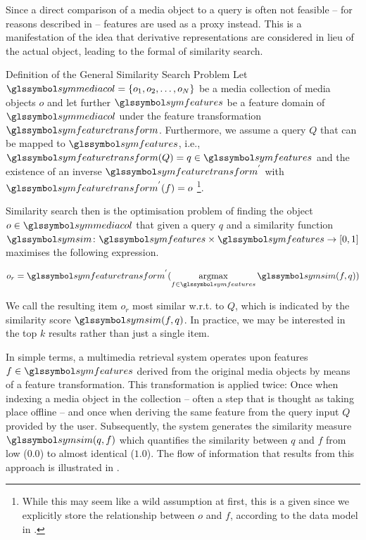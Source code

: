 Since a direct comparison of a media object to a query is often not feasible -- for reasons described in  -- features are used as a proxy instead. This is a manifestation of the idea that derivative representations are considered in lieu of the actual object, leading to the formal  of similarity search.

\begin{definition}[label=definition:similarity_search]{Definition of the General Similarity Search Problem}{}
    Let $\symmediacol = \lbrace o_1, o_2, \ldots, o_N \rbrace$ be a media collection of media objects $o$ and let further $\symfeatures$ be a feature domain of $\symmediacol$ under the feature transformation $\symfeaturetransform$. Furthermore, we assume a query $Q$ that can be mapped to $\symfeatures$, i.e., $\symfeaturetransform(Q) = q \in \symfeatures$ and the existence of an inverse $\symfeaturetransform^{'}$ with $\symfeaturetransform^{'}(f) = o$ \footnote{While this may seem like a wild assumption at first, this is a given since we explicitly store the relationship between $o$ and $f$, according to the data model in .}.

    Similarity search then is the optimisation problem of finding the object $o \in \symmediacol$ that given a query $q$ and a similarity function $\symsim \colon \symfeatures \times \symfeatures \rightarrow [0, 1]$ maximises the following expression.

    \begin{equation}
       o_r =  \symfeaturetransform^{'} (\argmax_{f \in \symfeatures} \symsim(f,q))
    \end{equation}
 
    We call the resulting item $o_r$ most similar w.r.t. to $Q$, which is indicated by the similarity score $\symsim(f,q)$. In practice, we may be interested in the top $k$ results rather than just a single item.
\end{definition}

In simple terms, a multimedia retrieval system operates upon features $f \in \symfeatures$ derived from the original media objects by means of a feature transformation. This transformation is applied twice: Once when indexing a media object in the collection -- often a step that is thought as taking place offline -- and once when deriving the same feature from the query input $Q$ provided by the user. Subsequently, the system generates the similarity measure $\symsim(q,f)$ which quantifies the similarity between $q$ and $f$ from low ($0.0$) to almost identical ($1.0$). The flow of information that results from this approach is illustrated in . 

